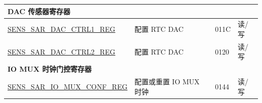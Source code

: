 \begin{longtable}{ | p{6cm} | p{7.2cm} | p{1.3cm} | p{1cm} | }
\multicolumn{4}{|l|}{\textbf{DAC 传感器寄存器}} \\ \hline
\hyperref[regdesc:SENSSARDACCTRL1REG]{SENS\_SAR\_DAC\_CTRL1\_REG} & 配置 RTC DAC & \hexprefix{}011C & 读/写 \\ \hline
\hyperref[regdesc:SENSSARDACCTRL2REG]{SENS\_SAR\_DAC\_CTRL2\_REG} & 配置 RTC DAC & \hexprefix{}0120 & 读/写 \\ \hline
\multicolumn{4}{|l|}{\textbf{IO MUX 时钟门控寄存器}} \\ \hline
\hyperref[regdesc:SENSSARIOMUXCONFREG]{SENS\_SAR\_IO\_MUX\_CONF\_REG} & 配置或重置 IO MUX 时钟 & \hexprefix{}0144 & 读/写 \\ \hline
\end{longtable}
